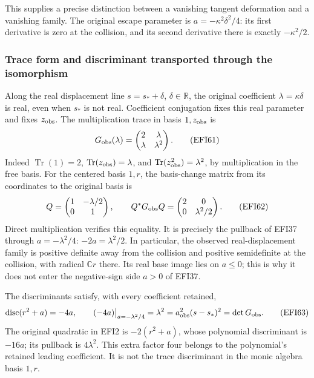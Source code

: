 \documentclass[
  10pt,
  a4paper,
]{article}
\begin{document}
This supplies a precise distinction between a vanishing tangent
deformation and a vanishing family. The original escape parameter is
\(a=-\kappa^2\delta^2/4\): its first derivative is zero at the
collision, and its second derivative there is exactly \(-\kappa^2/2\).

\subsubsection{Trace form and discriminant transported through the
isomorphism}\label{trace-form-and-discriminant-transported-through-the-isomorphism}

Along the real displacement line \(s=s_*+\delta\),
\(\delta\in\mathbb R\), the original coefficient
\(\lambda=\kappa\delta\) is real, even when \(s_*\) is not real.
Coefficient conjugation fixes this real parameter and fixes
\(z_{\rm obs}\). The multiplication trace in basis \(1,z_{\rm obs}\) is
\[
G_{\rm obs}(\lambda)=
\begin{pmatrix}2&\lambda\\\lambda&\lambda^2\end{pmatrix}.
\tag{EFI61}
\] Indeed \(\operatorname{Tr}(1)=2\),
\(\operatorname{Tr}(z_{\rm obs})=\lambda\), and
\(\operatorname{Tr}(z_{\rm obs}^2)=\lambda^2\), by multiplication in the
free basis. For the centered basis \(1,r\), the basis-change matrix from
its coordinates to the original basis is \[
Q=\begin{pmatrix}1&-\lambda/2\\0&1\end{pmatrix},\qquad
Q^*G_{\rm obs}Q=
\begin{pmatrix}2&0\\0&\lambda^2/2\end{pmatrix}.
\tag{EFI62}
\] Direct multiplication verifies this equality. It is precisely the
pullback of EFI37 through \(a=-\lambda^2/4\): \(-2a=\lambda^2/2\). In
particular, the observed real-displacement family is positive definite
away from the collision and positive semidefinite at the collision, with
radical \(\mathbb C r\) there. Its real base image lies on \(a\le0\);
this is why it does not enter the negative-sign side \(a>0\) of EFI37.

The discriminants satisfy, with every coefficient retained, \[
\operatorname{disc}(r^2+a)=-4a,\qquad
(-4a)\big|_{a=-\lambda^2/4}=\lambda^2
=a_{\rm obs}^2(s-s_*)^2
=\det G_{\rm obs}.
\tag{EFI63}
\] The original quadratic in EFI2 is \(-2(r^2+a)\), whose polynomial
discriminant is \(-16a\); its pullback is \(4\lambda^2\). This extra
factor four belongs to the polynomial's retained leading coefficient. It
is not the trace discriminant in the monic algebra basis \(1,r\).
\end{document}
